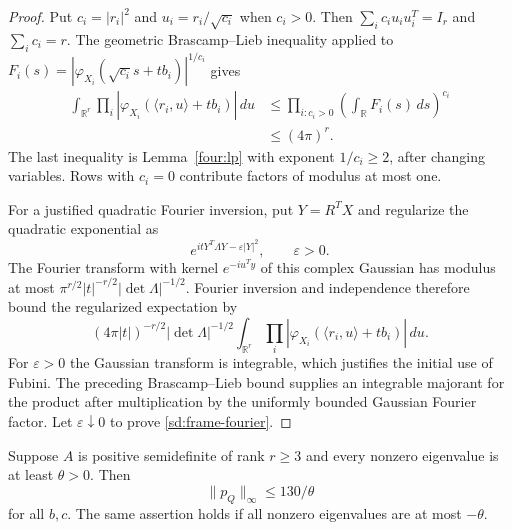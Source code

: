 \begin{proof}
Put $c_i=|r_i|^2$ and $u_i=r_i/\sqrt{c_i}$ when $c_i>0$.
Then $\sum_i c_i u_i u_i^T=I_r$ and $\sum_i c_i=r$.
The geometric Brascamp--Lieb inequality \citep{BL1976,Lieb1990}
applied to
$F_i(s)=|\varphi_{X_i}(\sqrt{c_i}s+tb_i)|^{1/c_i}$ gives
\begin{align*}
 \int_{\mathbb R^r}
  \prod_i|\varphi_{X_i}(\langle r_i,u\rangle+tb_i)|\,du
 &\leq\prod_{i:c_i>0}\left(\int_{\mathbb R}F_i(s)\,ds\right)^{c_i}\\
 &\leq(4\pi)^r.
\end{align*}
The last inequality is Lemma~\ref{four:lp} with exponent
$1/c_i\geq2$, after changing variables.  Rows with $c_i=0$
contribute factors of modulus at most one.

For a justified quadratic Fourier inversion, put $Y=R^TX$ and
regularize the quadratic exponential as
\[
 e^{itY^T\Lambda Y-\varepsilon|Y|^2},\qquad \varepsilon>0.
\]
The Fourier transform with kernel $e^{-iu^Ty}$ of this complex
Gaussian has modulus at most
$\pi^{r/2}|t|^{-r/2}|\det\Lambda|^{-1/2}$.
Fourier inversion and independence therefore bound the
regularized expectation by
\[
 (4\pi|t|)^{-r/2}|\det\Lambda|^{-1/2}
 \int_{\mathbb R^r}
   \prod_i|\varphi_{X_i}(\langle r_i,u\rangle+tb_i)|\,du.
\]
For $\varepsilon>0$ the Gaussian transform is integrable, which
justifies the initial use of Fubini.  The preceding
Brascamp--Lieb bound supplies an integrable majorant for the
product after multiplication by the uniformly bounded Gaussian
Fourier factor.  Let $\varepsilon\downarrow0$ to prove
\eqref{sd:frame-fourier}.
\end{proof}

\begin{theorem}\label{sd:separated}
Suppose $A$ is positive semidefinite of rank $r\geq3$ and every
nonzero eigenvalue is at least $\theta>0$.  Then
\begin{equation}\label{sd:separated-bound}
 \|p_Q\|_\infty\leq130/\theta
\end{equation}
for all $b,c$.  The same assertion holds if all nonzero
eigenvalues are at most $-\theta$.
\end{theorem}

